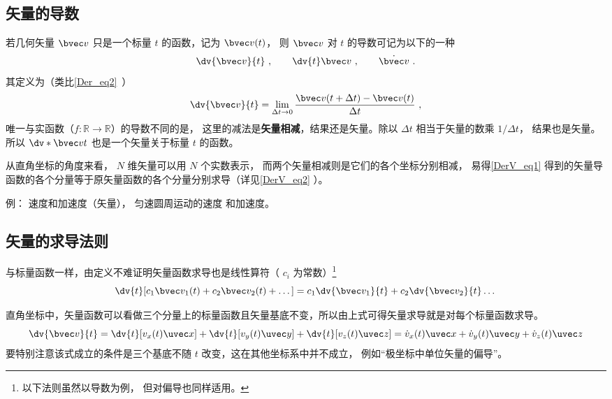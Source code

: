 
\begin{issues}
\end{issues}



\subsection{矢量的导数}

若几何矢量 $\bvec v$ 只是一个标量 $t$ 的函数，记为 $\bvec v(t)$， 则 $\bvec v$ 对 $t$ 的导数可记为以下的一种
\begin{equation}
\dv{\bvec v}{t}~, \qquad \dv{t}\bvec v~, \qquad \dot{\bvec v}~.
\end{equation}
其定义为（类比\autoref{Der_eq2}~）
\begin{equation}\label{DerV_eq1}
\dv{\bvec v}{t} = \lim_{\Delta t \to 0} \frac{\bvec v ( t + \Delta t) - \bvec v(t)}{\Delta t}~,
\end{equation}
唯一与实函数（$f:\mathbb R \to \mathbb R$）的导数不同的是， 这里的减法是\textbf{矢量相减}，结果还是矢量。除以 $\Delta t$ 相当于矢量的数乘 $1/\Delta t$， 结果也是矢量。 所以 $\dv*{\bvec v}{t}$ 也是一个矢量关于标量 $t$ 的函数。

从直角坐标的角度来看， $N$ 维矢量可以用 $N$ 个实数表示， 而两个矢量相减则是它们的各个坐标分别相减， 易得\autoref{DerV_eq1} 得到的矢量导函数的各个分量等于原矢量函数的各个分量分别求导（详见\autoref{DerV_eq2} ）。

例： 速度和加速度（矢量）， 匀速圆周运动的速度 和加速度。

\subsection{矢量的求导法则}
与标量函数一样，由定义不难证明矢量函数求导也是线性算符（ $c_i$ 为常数）\footnote{以下法则虽然以导数为例， 但对偏导也同样适用。}
\begin{equation}
\dv{t}[c_1 \bvec v_1(t) + c_2 \bvec v_2(t) + \dots] = c_1\dv{\bvec v_1}{t} + c_2\dv{\bvec v_2}{t} \dots
\end{equation}

直角坐标中，矢量函数可以看做三个分量上的标量函数且矢量基底不变，所以由上式可得矢量求导就是对每个标量函数求导。
\begin{equation}\label{DerV_eq2}
\dv{\bvec v}{t} = \dv{t}[v_x(t)\uvec x] + \dv{t}[v_y(t)\uvec y] + \dv{t}[v_z(t)\uvec z]
= \dot v_x(t)\uvec x + \dot v_y(t)\uvec y + \dot v_z(t)\uvec z
\end{equation}
要特别注意该式成立的条件是三个基底不随 $t$ 改变，这在其他坐标系中并不成立， 例如“极坐标中单位矢量的偏导”。

